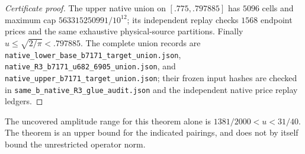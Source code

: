 \begin{proof}[Certificate proof]
The upper native union on $[.775,.797885]$ has $5096$ cells and
maximum cap $563315250991/10^{12}$; its independent replay checks
$1568$ endpoint prices and the same exhaustive physical-source
partitions.  Finally $u\le\sqrt{2/\pi}<.797885$.
The complete union records are
\texttt{native\_lower\_base\_b7171\_target\_union.json},
\texttt{native\_R3\_b7171\_u682\_6905\_union.json}, and
\texttt{native\_upper\_b7171\_target\_union.json}; their frozen
input hashes are checked in
\texttt{same\_b\_native\_R3\_glue\_audit.json} and the independent
native price replay ledgers.
\end{proof}
The uncovered amplitude range for this theorem alone is
$1381/2000<u<31/40$.  The theorem is an upper bound for the indicated
pairings, and does not by itself bound the unrestricted operator norm.
